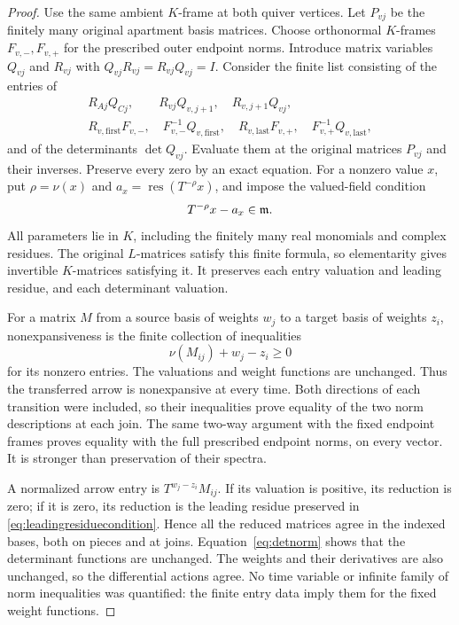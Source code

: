 \begin{proof}
Use the same ambient $K$-frame at both quiver vertices. Let
$P_{vj}$ be the finitely many original apartment basis matrices.
Choose orthonormal $K$-frames $F_{v,-},F_{v,+}$ for the prescribed
outer endpoint norms. Introduce matrix variables $Q_{vj}$ and
$R_{vj}$ with $Q_{vj}R_{vj}=R_{vj}Q_{vj}=I$. Consider the finite
list consisting of the entries of
\[
 \begin{gathered}
 R_{Aj}Q_{Cj},\qquad
 R_{vj}Q_{v,j+1},\quad R_{v,j+1}Q_{vj},\\
 R_{v,\mathrm{first}}F_{v,-},\quad
 F_{v,-}^{-1}Q_{v,\mathrm{first}},\quad
 R_{v,\mathrm{last}}F_{v,+},\quad
 F_{v,+}^{-1}Q_{v,\mathrm{last}},
 \end{gathered}
\]
and of the determinants $\det Q_{vj}$. Evaluate them at the
original matrices $P_{vj}$ and their inverses. Preserve every
zero by an exact equation. For a nonzero value $x$, put
$\rho=\nu(x)$ and $a_x=\operatorname{res}(T^{-\rho}x)$, and
impose the valued-field condition
\begin{equation}\label{eq:leadingresiduecondition}
 T^{-\rho}x-a_x\in\mathfrak m.
\end{equation}
All parameters lie in $K$, including the finitely many real
monomials and complex residues. The original $L$-matrices satisfy
this finite formula, so elementarity gives invertible $K$-matrices
satisfying it. It preserves each entry valuation and leading
residue, and each determinant valuation.

For a matrix $M$ from a source basis of weights $w_j$ to a target
basis of weights $z_i$, nonexpansiveness is the finite collection
of inequalities
\begin{equation}\label{eq:matrixorder}
 \nu(M_{ij})+w_j-z_i\ge0
\end{equation}
for its nonzero entries. The valuations and weight functions are
unchanged. Thus the transferred arrow is nonexpansive at every
time. Both directions of each transition were included, so their
inequalities prove equality of the two norm descriptions at each
join. The same two-way argument with the fixed endpoint frames
proves equality with the full prescribed endpoint norms, on every
vector. It is stronger than preservation of their spectra.

A normalized arrow entry is $T^{w_j-z_i}M_{ij}$. If its valuation
is positive, its reduction is zero; if it is zero, its reduction
is the leading residue preserved in
\eqref{eq:leadingresiduecondition}. Hence all the reduced matrices
agree in the indexed bases, both on pieces and at joins.
Equation~\eqref{eq:detnorm} shows that the determinant functions
are unchanged. The weights and their derivatives are also
unchanged, so the differential actions agree. No time variable
or infinite family of norm inequalities was quantified: the finite
entry data imply them for the fixed weight functions.
\end{proof}

